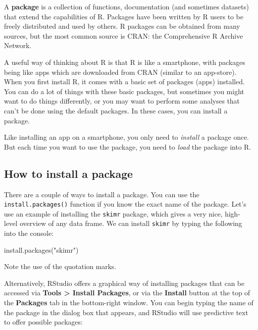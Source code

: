 \documentclass[
]{memoir}
\newenvironment{Shaded}{\begin{snugshade}}{\end{snugshade}}
\newcommand{\FunctionTok}[1]{\textcolor[rgb]{0.00,0.00,0.00}{#1}}
\newcommand{\NormalTok}[1]{#1}
\newcommand{\StringTok}[1]{\textcolor[rgb]{0.31,0.60,0.02}{#1}}
\begin{document}
A \textbf{package} is a collection of functions, documentation (and sometimes datasets) that extend the capabilities of R. Packages have been written by R users to be freely distributed and used by others. R packages can be obtained from many sources, but the most common source is CRAN: the Comprehensive R Archive Network.

A useful way of thinking about R is that R is like a smartphone, with packages being like apps which are downloaded from CRAN (similar to an app-store). When you first install R, it comes with a basic set of packages (apps) installed. You can do a lot of things with these basic packages, but sometimes you might want to do things differently, or you may want to perform some analyses that can't be done using the default packages. In these cases, you can install a package.

Like installing an app on a smartphone, you only need to \emph{install} a package once. But each time you want to use the package, you need to \emph{load} the package into R.

\hypertarget{how-to-install-a-package}{%
\subsection{How to install a package}\label{how-to-install-a-package}}

There are a couple of ways to install a package. You can use the \texttt{install.packages()} function if you know the exact name of the package. Let's use an example of installing the \texttt{skimr} package, which gives a very nice, high-level overview of any data frame. We can install \texttt{skimr} by typing the following into the console:

\begin{Shaded}
\begin{Highlighting}[]
\FunctionTok{install.packages}\NormalTok{(}\StringTok{"skimr"}\NormalTok{)}
\end{Highlighting}
\end{Shaded}

Note the use of the quotation marks.

Alternatively, RStudio offers a graphical way of installing packages that can be accessed via \textbf{Tools \textgreater{} Install Packages}, or via the \textbf{Install} button at the top of the \textbf{Packages} tab in the bottom-right window. You can begin typing the name of the package in the dialog box that appears, and RStudio will use predictive text to offer possible packages:
\end{document}
